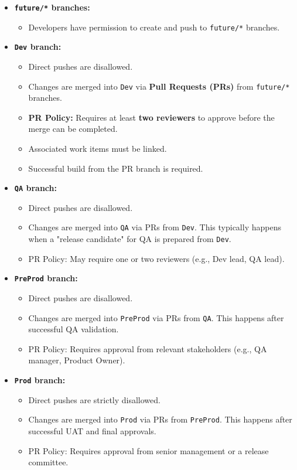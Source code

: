 \begin{itemize}
    \item \textbf{\texttt{future/*} branches:}
    \begin{itemize}
        \item Developers have permission to create and push to \texttt{future/*} branches.
    \end{itemize}
    \item \textbf{\texttt{Dev} branch:}
    \begin{itemize}
        \item Direct pushes are disallowed.
        \item Changes are merged into \texttt{Dev} via \textbf{Pull Requests (PRs)} from \texttt{future/*} branches.
        \item \textbf{PR Policy:} Requires at least \textbf{two reviewers} to approve before the merge can be completed.
        \item Associated work items must be linked.
        \item Successful build from the PR branch is required.
    \end{itemize}
    \item \textbf{\texttt{QA} branch:}
    \begin{itemize}
        \item Direct pushes are disallowed.
        \item Changes are merged into \texttt{QA} via PRs from \texttt{Dev}. This typically happens when a "release candidate" for QA is prepared from \texttt{Dev}.
        \item PR Policy: May require one or two reviewers (e.g., Dev lead, QA lead).
    \end{itemize}
    \item \textbf{\texttt{PreProd} branch:}
    \begin{itemize}
        \item Direct pushes are disallowed.
        \item Changes are merged into \texttt{PreProd} via PRs from \texttt{QA}. This happens after successful QA validation.
        \item PR Policy: Requires approval from relevant stakeholders (e.g., QA manager, Product Owner).
    \end{itemize}
    \item \textbf{\texttt{Prod} branch:}
    \begin{itemize}
        \item Direct pushes are strictly disallowed.
        \item Changes are merged into \texttt{Prod} via PRs from \texttt{PreProd}. This happens after successful UAT and final approvals.
        \item PR Policy: Requires approval from senior management or a release committee.
    \end{itemize}
\end{itemize}

